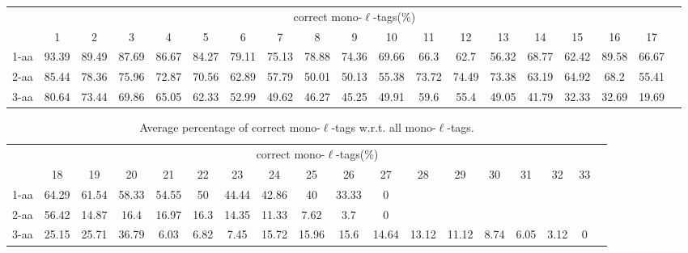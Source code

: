 \documentclass{article}
\begin{document}
\begin{table}[h]\tiny
\vspace{3mm}
{\centering
\begin{center}
\begin{tabular}{|l|c|c|c|c|c|c|c|c|c|c|c|c|c|c|c|c|c|c|}
  \hline
  & \multicolumn{ 17 }{|c|}{correct mono-$\ell$-tags(\%)} \\
  \cline{2- 18}
    & 1 & 2 & 3 & 4 & 5 & 6 & 7 & 8 & 9 & 10 & 11 & 12 & 13 & 14 & 15 & 16 & 17\\
  \hline
1-aa  & 93.39 & 89.49 & 87.69 & 86.67 & 84.27 & 79.11 & 75.13 & 78.88 & 74.36 & 69.66 & 66.3 & 62.7 & 56.32 & 68.77 & 62.42 & 89.58 & 66.67\\
2-aa  & 85.44 & 78.36 & 75.96 & 72.87 & 70.56 & 62.89 & 57.79 & 50.01 & 50.13 & 55.38 & 73.72 & 74.49 & 73.38 & 63.19 & 64.92 & 68.2 & 55.41\\
3-aa  & 80.64 & 73.44 & 69.86 & 65.05 & 62.33 & 52.99 & 49.62 & 46.27 & 45.25 & 49.91 & 59.6 & 55.4 & 49.05 & 41.79 & 32.33 & 32.69 & 19.69\\
 \hline
\end{tabular}
\end{center}
\par}
\centering

\vspace{3mm}
\label{table:table5}
\end{table}
\begin{table}[h]\tiny
\vspace{3mm}
{\centering
\begin{center}
\begin{tabular}{|l|c|c|c|c|c|c|c|c|c|c|c|c|c|c|c|c|c|}
  \hline
  & \multicolumn{ 16 }{|c|}{correct mono-$\ell$-tags(\%)} \\
  \cline{2- 17}
    & 18 & 19 & 20 & 21 & 22 & 23 & 24 & 25 & 26 & 27 & 28 & 29 & 30 & 31 & 32 & 33\\
  \hline
1-aa  & 64.29 & 61.54 & 58.33 & 54.55 & 50 & 44.44 & 42.86 & 40 & 33.33 & 0 &  &  &  &  &  & \\
2-aa  & 56.42 & 14.87 & 16.4 & 16.97 & 16.3 & 14.35 & 11.33 & 7.62 & 3.7 & 0 &  &  &  &  &  & \\
3-aa  & 25.15 & 25.71 & 36.79 & 6.03 & 6.82 & 7.45 & 15.72 & 15.96 & 15.6 & 14.64 & 13.12 & 11.12 & 8.74 & 6.05 & 3.12 & 0\\
 \hline
\end{tabular}
\end{center}
\par}
\centering

\caption{ Average percentage of correct mono-$\ell$-tags w.r.t. all mono-$\ell$-tags.}

\vspace{3mm}
\label{table:table5}
\end{table}
\end{document}
